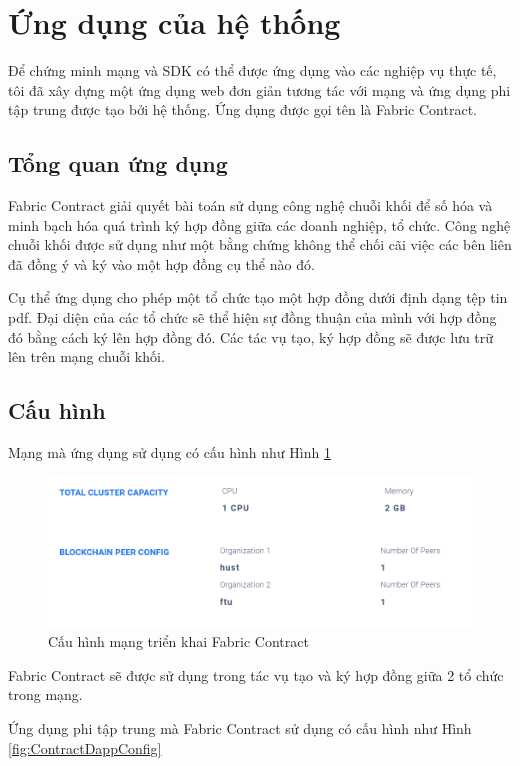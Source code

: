 \documentclass[../DoAn.tex]{subfiles}
\begin{document}
\section{Ứng dụng của hệ thống}

Để chứng minh mạng và SDK có thể được ứng dụng vào các nghiệp vụ thực tế, tôi đã xây dựng một ứng dụng web đơn giản tương tác với mạng và ứng dụng phi tập trung được tạo bởi hệ thống. Ứng dụng được gọi tên là Fabric Contract.

\subsection{Tổng quan ứng dụng}

Fabric Contract giải quyết bài toán sử dụng công nghệ chuỗi khối để số hóa và
minh bạch hóa quá trình ký hợp đồng giữa các doanh nghiệp, tổ chức. Công nghệ
chuỗi khối được sử dụng như một bằng chứng không thể chối cãi việc các bên liên
đã đồng ý và ký vào một hợp đồng cụ thể nào đó.

Cụ thể ứng dụng cho phép một tổ chức tạo một hợp đồng dưới định dạng tệp tin
pdf. Đại diện của các tổ chức sẽ thể hiện sự đồng thuận của mình với hợp đồng
đó bằng cách ký lên hợp đồng đó. Các tác vụ tạo, ký hợp đồng sẽ được lưu trữ
lên trên mạng chuỗi khối.

\subsection{Cấu hình}

Mạng mà ứng dụng sử dụng có cấu hình như Hình
\ref{fig:ContractAppNetworkConfig}

\begin{figure}[H]
    \centering
    \includegraphics[width=0.75\linewidth]{Hinhve/DoAn-ContractAppNetworkConfig.png}
    \caption{Cấu hình mạng triển khai Fabric Contract}
    \label{fig:ContractAppNetworkConfig}
\end{figure}

Fabric Contract sẽ được sử dụng trong tác vụ tạo và ký hợp đồng giữa 2 tổ chức
trong mạng.

Ứng dụng phi tập trung mà Fabric Contract sử dụng có cấu hình như Hình \ref{fig:ContractDappConfig}
\end{document}
